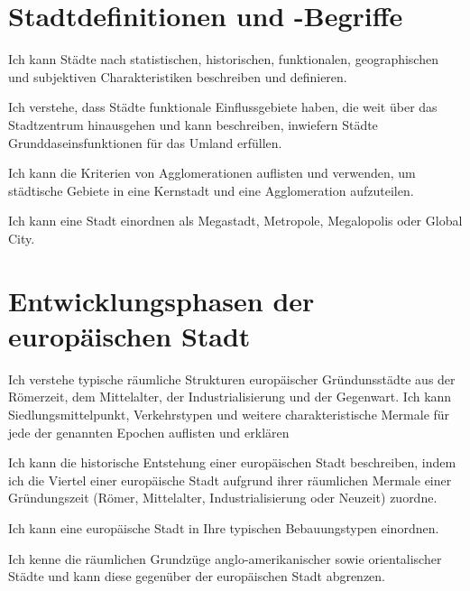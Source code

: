 \section*{Stadtdefinitionen und -Begriffe}
\begin{todolist}
\item Ich kann Städte nach statistischen, historischen, funktionalen, geographischen und subjektiven Charakteristiken beschreiben und definieren.
\item Ich verstehe, dass Städte funktionale Einflussgebiete haben, die weit über das Stadtzentrum hinausgehen und kann beschreiben, inwiefern Städte Grunddaseinsfunktionen für das Umland erfüllen.
\item Ich kann die Kriterien von Agglomerationen auflisten und verwenden, um städtische Gebiete in eine Kernstadt und eine Agglomeration aufzuteilen.
\item Ich kann eine Stadt einordnen als Megastadt, Metropole, Megalopolis oder Global City.
\end{todolist}


\section*{Entwicklungsphasen der europäischen Stadt}
\begin{todolist}
\item Ich verstehe typische räumliche Strukturen europäischer Gründunsstädte aus der Römerzeit, dem Mittelalter, der Industrialisierung und der Gegenwart. Ich kann Siedlungsmittelpunkt, Verkehrstypen und weitere charakteristische Mermale für jede der genannten Epochen auflisten und erklären
\item Ich kann die historische Entstehung einer europäischen Stadt beschreiben, indem ich die Viertel einer europäische Stadt aufgrund ihrer räumlichen Mermale einer Gründungszeit (Römer, Mittelalter, Industrialisierung oder Neuzeit) zuordne.
\item Ich kann eine europäische Stadt in Ihre typischen Bebauungstypen einordnen.
\item Ich kenne die räumlichen Grundzüge anglo-amerikanischer sowie orientalischer Städte und kann diese gegenüber der europäischen Stadt abgrenzen.
\end{todolist}

